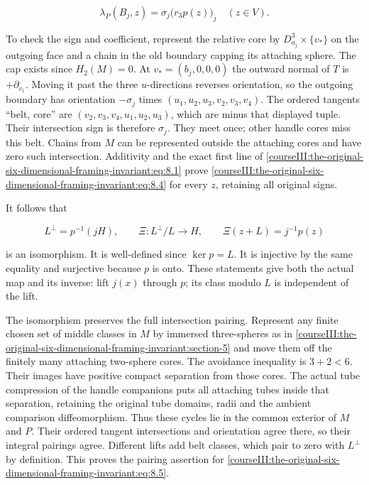 \begin{equation}
\lambda_P(B_j,z)=\sigma_j\bigl(r_3p(z)\bigr)_j
                         \quad (z\in V).
 \label{courseIII:the-original-six-dimensional-framing-invariant:eq:8.4}
\end{equation}

To check the sign and coefficient, represent the relative core by \(D^3_{a_j}\times\{v_*\}\) on the outgoing face and a chain in the old boundary capping its attaching sphere. The cap exists since \(H_2(M)=0\). At \(v_*=(b_j,0,0,0)\) the outward normal of \(T\) is \(+\partial_{v_1}\). Moving it past the three \(u\)-directions reverses orientation, so the outgoing boundary has orientation \(-\sigma_j\) times
\((u_1,u_2,u_3,v_2,v_3,v_4)\).
The ordered tangents ``belt, core'' are
\((v_2,v_3,v_4,u_1,u_2,u_3)\),
which are minus that displayed tuple. Their intersection sign is therefore \(\sigma_j\). They meet once; other handle cores miss this belt. Chains from \(M\) can be represented outside the attaching cores and have zero such intersection. Additivity and the exact first line of \eqref{courseIII:the-original-six-dimensional-framing-invariant:eq:8.1} prove \eqref{courseIII:the-original-six-dimensional-framing-invariant:eq:8.4} for every \(z\), retaining all original signs.

It follows that

\begin{equation}
L^\perp=p^{-1}(jH),\qquad
 \Xi:L^\perp/L\longrightarrow H,\qquad
                    \Xi(z+L)=j^{-1}p(z)
 \label{courseIII:the-original-six-dimensional-framing-invariant:eq:8.5}
\end{equation}

is an isomorphism. It is well-defined since \(\ker p=L\). It is injective by the same equality and surjective because \(p\) is onto. These statements give both the actual map and its inverse: lift \(j(x)\) through \(p\); its class modulo \(L\) is independent of the lift.

The isomorphism preserves the full intersection pairing. Represent any finite chosen set of middle classes in \(M\) by immersed three-spheres as in \cref{courseIII:the-original-six-dimensional-framing-invariant:section-5} and move them off the finitely many attaching two-sphere cores. The avoidance inequality is \(3+2<6\). Their images have positive compact separation from those cores. The actual tube compression of the handle companions puts all attaching tubes inside that separation, retaining the original tube domains, radii and the ambient comparison diffeomorphism. Thus these cycles lie in the common exterior of \(M\) and \(P\). Their ordered tangent intersections and orientation agree there, so their integral pairings agree. Different lifts add belt classes, which pair to zero with \(L^\perp\) by definition. This proves the pairing assertion for \eqref{courseIII:the-original-six-dimensional-framing-invariant:eq:8.5}.

